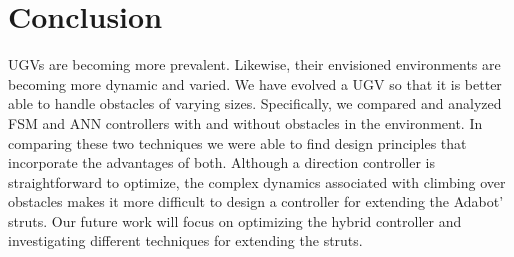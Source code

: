 \section{Conclusion}
\label{sec:conclusion}

UGVs are becoming more prevalent. Likewise, their envisioned environments are becoming more dynamic and varied.
%
We have evolved a UGV so that it is better able to handle obstacles of varying sizes.
%
Specifically, we compared and analyzed FSM and ANN controllers with and without obstacles in the environment.
%
In comparing these two techniques we were able to find design principles that incorporate the advantages of both.
%
Although a direction controller is straightforward to optimize, the complex dynamics associated with climbing over obstacles makes it more difficult to design a controller for extending the Adabot' struts.
%
Our future work will focus on optimizing the hybrid controller and investigating different techniques for extending the struts.



